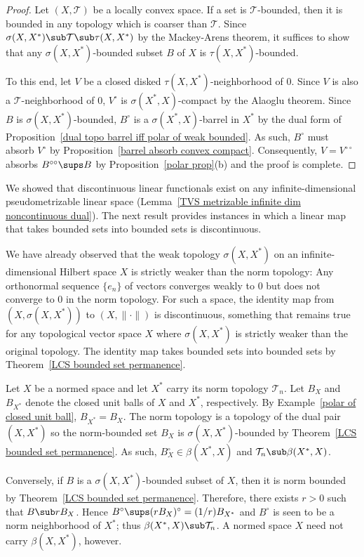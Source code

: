 \begin{proof}
Let $(X,\mathcal{T})$ be a locally convex space. If a set is $\mathcal{T}$-bounded, then it is bounded in any topology which is coarser than $\mathcal{T}$. Since $\sigma(X,X^*)\sub\mathcal{T}\sub\tau(X,X^*)$ by the Mackey-Arens theorem, it suffices to show that any $\sigma(X,X^*)$-bounded subset $B$ of $X$ is $\tau(X,X^*)$-bounded.\par
To this end, let $V$ be a closed disked $\tau(X,X^*)$-neighborhood of $0$. Since $V$ is also a $\mathcal{T}$-neighborhood of $0$, $V^\circ$ is $\sigma(X^*,X)$-compact by the Alaoglu theorem. Since $B$ is $\sigma(X,X^*)$-bounded, $B^\circ$ is a $\sigma(X^*,X)$-barrel in $X^*$ by the dual form of Proposition~\ref{dual topo barrel iff polar of weak bounded}. As such, $B^\circ$ must absorb $V^\circ$ by Proposition~\ref{barrel absorb convex compact}. Consequently, $V=V^{\circ\circ}$ absorbs $B^{\circ\circ}\sups B$ by Proposition~\ref{polar prop}(b) and the proof is complete.
\end{proof}
We showed that discontinuous linear functionals exist on any infinite-dimensional pseudometrizable linear space (Lemma~\ref{TVS metrizable infinite dim noncontinuous dual}). The next result provides instances in which a linear map that takes bounded sets into bounded sets is discontinuous.
\begin{example}
We have already observed that the weak topology $\sigma(X,X^*)$ on an infinite-dimensional Hilbert space $X$ is strictly weaker than the norm topology: Any orthonormal sequence $\{e_n\}$ of vectors converges weakly to $0$ but does not converge to $0$ in the norm topology. For such a space, the identity map from $(X,\sigma(X,X^*))$ to $(X,\|\cdot\|)$ is discontinuous, something that remains true for any topological vector space $X$ where $\sigma(X,X^*)$ is strictly weaker than the original topology. The identity map takes bounded sets into bounded sets by Theorem~\ref{LCS bounded set permanence}.
\end{example}
\begin{example}\label{NVS dual carry beta(X^*,X)}
Let $X$ be a normed space and let $X^*$ carry its norm topology $\mathcal{T}_n$. Let $B_X$ and $B_{X^*}$ denote the closed unit balls of $X$ and $X^*$, respectively. By Example~\ref{polar of closed unit ball}, $B_{X^*}=B_{X}$. The norm topology is a topology of the dual pair $(X,X^*)$ so the norm-bounded set $B_X$ is $\sigma(X,X^*)$-bounded by Theorem~\ref{LCS bounded set permanence}. As such, $B_X^\circ\in\beta(X^*,X)$ and $\mathcal{T}_n\sub\beta(X^*,X)$.\par
Conversely, if $B$ is a $\sigma(X,X^*)$-bounded subset of $X$, then it is norm bounded by Theorem~\ref{LCS bounded set permanence}. Therefore, there exists $r>0$ such that $B\sub rB_X$. Hence $B^\circ\sups(rB_X)^\circ=(1/r)B_{X^*}$ and $B^\circ$ is seen to be a norm neighborhood of $X^*$; thus $\beta(X^*,X)\sub\mathcal{T}_n$. A normed space $X$ need not carry $\beta(X,X^*)$, however.
\end{example}
